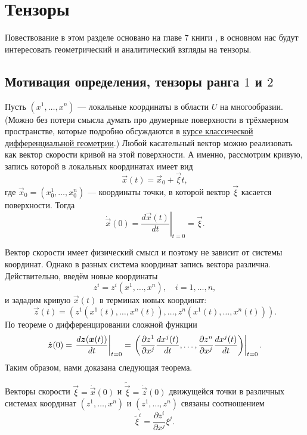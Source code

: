 \section{Тензоры}

Повествование в этом разделе основано на главе 7 книги \cite{NT14}, в основном нас будут интересовать геометрический и аналитический взгляды на тензоры.

\subsection{Мотивация определения, тензоры ранга $1$ и $2$}

Пусть $(x^1, \ldots, x^n)$ --- локальные координаты в области $U$ на многообразии. (Можно без потери смысла думать про двумерные поверхности в трёхмерном пространстве, которые подробно обсуждаются в \href{https://github.com/pshenikita/Differential-Geometry}{курсе классической дифференциальной геометрии}.) Любой касательный вектор можно реализовать как вектор скорости кривой на этой поверхности. А именно, рассмотрим кривую, запись которой в локальных координатах имеет вид
\[
	\vec{x}(t) = \vec{x}_0 + \vec{\xi}t,
\]
где $\vec{x}_0 = (x_0^1, \ldots, x_0^n)$ --- координаты точки, в которой вектор $\vec{\xi}$ касается поверхности. Тогда
\[
	\dot{\vec{x}}(0) = \left.\frac{d\vec{x}(t)}{dt}\right|_{t = 0} = \vec{\xi}.
\]

Вектор скорости имеет физический смысл и поэтому не зависит от системы координат. Однако в разных система координат запись вектора различна. Действительно, введём новые координаты
\[
	z^i = z^i(x^1, \ldots, x^n),\quad i = 1, \ldots, n,
\]
и зададим кривую $\vec{x}(t)$ в терминах новых координат:
\[
	\vec{z}(t) = (z^1(x^1(t), \ldots, x^n(t)), \ldots, z^n(x^1(t), \ldots, x^n(t))).
\]
По теореме о дифференцировании сложной функции
\[
	\dot{\boldsymbol{z}}(0) = \left.\frac{d\boldsymbol{z}(\boldsymbol{x}(t))}{dt}\right|_{t = 0} = \left.\left(\frac{\partial z^1}{\partial x^j}\frac{dx^j(t)}{dt}, \ldots, \frac{\partial z^n}{\partial x^j}\frac{dx^j(t)}{dt}\right)\right|_{t = 0}.
\]
Таким образом, нами доказана следующая теорема.

\begin{theorem}
	Векторы скорости $\vec{\xi} = \dot{\vec{x}}(0)$ и $\tilde{\vec{\xi}} = \dot{\vec{z}}(0)$ движущейся точки в различных системах координат $(z^1, \ldots, x^n)$ и $(z^1, \ldots, z^n)$ связаны соотношением
	\begin{equation} \label{eq:VectorLaw}
		\tilde{\xi}^i = \frac{\partial z^i}{\partial x^j}\xi^j.
	\end{equation}
\end{theorem}

